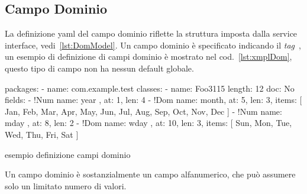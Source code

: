 \documentclass[a4paper,10pt]{report}
\newif\ifesource
\newenvironment{elisting}[1][H]
  {\captionsetup{aboveskip=0pt}\begin{listing}[#1]}
  {\end{listing}%
}
\begin{document}
\subsection{Campo Dominio} \label{sub:yaml.dom}
La definizione yaml del campo dominio riflette la struttura imposta dalla
service interface, vedi~\ref{lst:DomModel}.
Un campo dominio è specificato indicando il \textsl{tag} 
\,, 
un esempio di definizione di campi dominio è mostrato nel 
cod.~\ref{lst:xmplDom}, questo tipo di campo non ha nessun default globale.


\ifesource
\begin{figure*}[!htb]
\begin{lstlisting}[language=yaml, caption={esempio definizione campi dominio}, 
label=lst:xmplDom]
packages:
  - name: com.example.test
    classes:
      - name: Foo3115
        length: 12
        doc: No
        fields:
          - !Num { name: year , at: 1, len: 4 }
          - !Dom { name: month, at: 5, len: 3, 
                   items: [ Jan, Feb, Mar, Apr, May, Jun, Jul, Aug, Sep, Oct, Nov, Dec ] }
          - !Num { name: mday , at: 8, len: 2 }
          - !Dom { name: wday , at: 10, len: 3, 
                   items: [ Sun, Mon, Tue, Wed, Thu, Fri, Sat ] }
\end{lstlisting}
\end{figure*}
\else
\begin{elisting}[!htb]
\begin{yamlcode}
packages:
  - name: com.example.test
    classes:
      - name: Foo3115
        length: 12
        doc: No
        fields:
          - !Num { name: year , at: 1, len: 4 }
          - !Dom { name: month, at: 5, len: 3, 
                   items: [ Jan, Feb, Mar, Apr, May, Jun, Jul, Aug, Sep, Oct, Nov, Dec ] }
          - !Num { name: mday , at: 8, len: 2 }
          - !Dom { name: wday , at: 10, len: 3, 
                   items: [ Sun, Mon, Tue, Wed, Thu, Fri, Sat ] }
\end{yamlcode}
\caption{esempio definizione campi dominio}
\label{lst:xmplDom}
\end{elisting}
\fi

Un campo dominio è sostanzialmente un campo alfanumerico, che può assumere solo
un limitato numero di valori.
\end{document}
